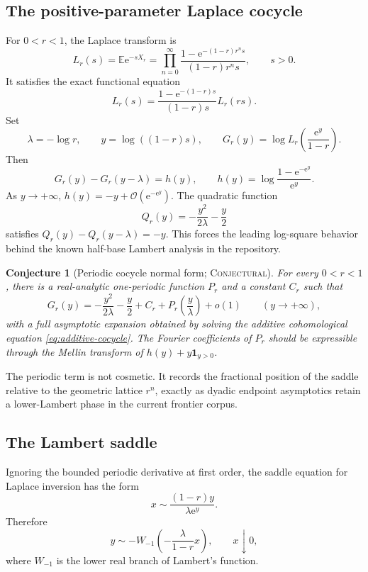 \documentclass[11pt,oneside]{article}
\newtheorem{conjecture}[theorem]{Conjecture}
\theoremstyle{definition}
\theoremstyle{remark}
\newcommand{\E}{\mathbb E}
\newcommand{\e}{\mathrm e}
\newcommand{\bigO}{\mathcal O}
\newcommand{\smallo}{o}
\newcommand{\Conjectural}{\textsc{Conjectural}}
\begin{document}
\subsection{The positive-parameter Laplace cocycle}
For \(0<r<1\), the Laplace transform is
\begin{equation}\label{eq:laplace-product}
 L_r(s)=\E\e^{-sX_r}
 =\prod_{n=0}^{\infty}
 \frac{1-\e^{-(1-r)r^ns}}{(1-r)r^ns},
 \qquad s>0.
\end{equation}
It satisfies the exact functional equation
\begin{equation}\label{eq:laplace-functional}
 L_r(s)=\frac{1-\e^{-(1-r)s}}{(1-r)s}L_r(rs).
\end{equation}
Set
\[
 \lambda=-\log r,
 \qquad
 y=\log((1-r)s),
 \qquad
 G_r(y)=\log L_r\!\left(\frac{\e^y}{1-r}\right).
\]
Then
\begin{equation}\label{eq:additive-cocycle}
 G_r(y)-G_r(y-\lambda)
 =h(y),
 \qquad
 h(y)=\log\frac{1-\e^{-\e^y}}{\e^y}.
\end{equation}
As \(y\to+\infty\), \(h(y)=-y+\bigO(\e^{-\e^y})\).  The quadratic function
\[
 Q_r(y)=-\frac{y^2}{2\lambda}-\frac y2
\]
satisfies \(Q_r(y)-Q_r(y-\lambda)=-y\).  This forces the leading log-square
behavior behind the known half-base Lambert analysis in the repository.

\begin{conjecture}[Periodic cocycle normal form; \Conjectural]\label{conj:periodic-cocycle}
For every \(0<r<1\), there is a real-analytic one-periodic function \(P_r\) and
a constant \(C_r\) such that
\begin{equation}\label{eq:periodic-cocycle-conj}
 G_r(y)=-\frac{y^2}{2\lambda}-\frac y2+C_r
 +P_r\!\left(\frac y\lambda\right)+\smallo(1)
 \qquad(y\to+\infty),
\end{equation}
with a full asymptotic expansion obtained by solving the additive cohomological
equation \eqref{eq:additive-cocycle}.  The Fourier coefficients of \(P_r\)
should be expressible through the Mellin transform of
\(h(y)+y\mathbf 1_{y>0}\).
\end{conjecture}

The periodic term is not cosmetic.  It records the fractional position of the
saddle relative to the geometric lattice \(r^n\), exactly as dyadic endpoint
asymptotics retain a lower-Lambert phase in the current frontier corpus.

\subsection{The Lambert saddle}
Ignoring the bounded periodic derivative at first order, the saddle equation
for Laplace inversion has the form
\begin{equation}\label{eq:saddle-leading}
 x\sim\frac{(1-r)y}{\lambda\e^y}.
\end{equation}
Therefore
\begin{equation}\label{eq:lambert-leading}
 y\sim-W_{-1}\!\left(-\frac{\lambda}{1-r}x\right),
 \qquad x\downarrow0,
\end{equation}
where \(W_{-1}\) is the lower real branch of Lambert's function.
\end{document}
